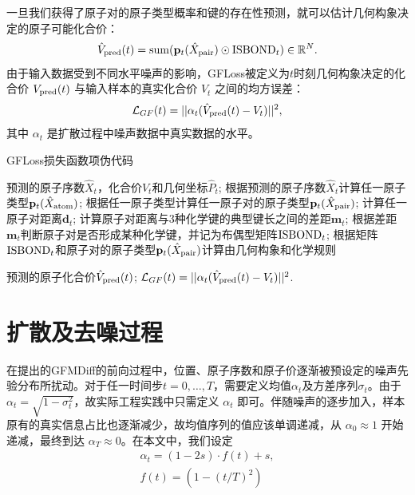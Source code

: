 一旦我们获得了原子对的原子类型概率和键的存在性预测，就可以估计几何构象决定的原子可能化合价：
\begin{equation}
     \hat{V}_{{\rm pred}}(t) = {\rm sum}({\mathbf{p}}_t(\hat{X}_{{\rm pair}}) \odot {\rm ISBOND}_t) \in \mathbb{R}^{N}.
\end{equation}
由于输入数据受到不同水平噪声的影响，GFLoss被定义为$t$时刻几何构象决定的化合价 $V_{{\rm pred}}(t)$ 与输入样本的真实化合价 $V_t$ 之间的均方误差：
\begin{equation}
    \mathcal{L}_{GF}(t) = ||\alpha_t(\hat{V}_{{\rm pred}}(t) - V_t)||^2,
\end{equation}
其中 $\alpha_t$ 是扩散过程中噪声数据中真实数据的水平。

\begin{algorithm}[H]
    \caption{GFLoss损失函数项伪代码}
    \label{alg:gfloss}
    \begin{algorithmic}
     预测的原子序数$\hat{X}_t$，化合价$\hat{V}_t$和几何坐标$\hat{P}_t$;
    \STATE 根据预测的原子序数$\hat{X}_t$计算任一原子类型${\mathbf{p}}_t(\hat{X}_{{\rm atom}})$;
    \STATE 根据任一原子类型计算任一原子对的原子类型${\mathbf{p}}_t(\hat{X}_{{\rm pair}})$;
    \STATE 计算任一原子对距离$\mathbf{d}_t$;
    \STATE 计算原子对距离与3种化学键的典型键长之间的差距$\mathbf{m}_t$;
    \STATE 根据差距$\mathbf{m}_t$判断原子对是否形成某种化学键，并记为布偶型矩阵${\rm ISBOND}_t$;
    \STATE 根据矩阵${\rm ISBOND}_t$和原子对的原子类型${\mathbf{p}}_t(\hat{X}_{{\rm pair}})$计算由几何构象和化学规则
    
    预测的原子化合价$\hat{V}_{{\rm pred}}(t)$;
     $\mathcal{L}_{GF}(t) = ||\alpha_t(\hat{V}_{{\rm pred}}(t) - V_t)||^2$.
    \end{algorithmic}
\end{algorithm}

\section{扩散及去噪过程}
在提出的GFMDiff的前向过程中，位置、原子序数和原子价逐渐被预设定的噪声先验分布所扰动。对于任一时间步$t = 0, \ldots, T$，需要定义均值$\alpha_t$及方差序列$\sigma_t$。由于 $\alpha_t = \sqrt{1 - \sigma_t^2}$，故实际工程实践中只需定义 $\alpha_t$ 即可。伴随噪声的逐步加入，样本原有的真实信息占比也逐渐减少，故均值序列的值应该单调递减，从 $\alpha_0 \approx 1$ 开始递减，最终到达 $\alpha_T \approx 0$。在本文中，我们设定
\begin{eqnarray}
    &\alpha_t = (1 - 2s) \cdot f(t) + s, & \\
    &f(t) = (1 - (t/T)^2)& 
\end{eqnarray}


